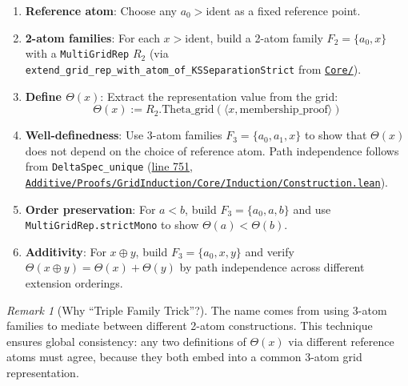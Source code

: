 \documentclass[11pt]{article}
\theoremstyle{definition}
\theoremstyle{remark}
\newtheorem{remark}[theorem]{Remark}
\begin{document}
\begin{enumerate}
\item \textbf{Reference atom}: Choose any $a_0 > \text{ident}$ as a fixed reference point.

\item \textbf{2-atom families}: For each $x > \text{ident}$, build a 2-atom family $F_2 = \{a_0, x\}$
with a \texttt{MultiGridRep} $R_2$ (via \texttt{extend\_grid\_rep\_with\_atom\_of\_KSSeparationStrict}
from \href{https://github.com/zariuq/ks-foundations-of-inference/tree/main/KnuthSkilling/Additive/Proofs/GridInduction/Core/}{\texttt{Core/}}).

\item \textbf{Define $\Theta(x)$}: Extract the representation value from the grid:
\[ \Theta(x) := R_2.\text{Theta\_grid}(\langle x, \text{membership\_proof} \rangle) \]

\item \textbf{Well-definedness}: Use 3-atom families $F_3 = \{a_0, a_1, x\}$ to show that $\Theta(x)$
does not depend on the choice of reference atom. Path independence follows from
\texttt{DeltaSpec\_unique} (\href{https://github.com/zariuq/ks-foundations-of-inference/blob/main/KnuthSkilling/Additive/Proofs/GridInduction/Core/Induction/Construction.lean\#L751}{line 751}, \href{https://github.com/zariuq/ks-foundations-of-inference/blob/main/KnuthSkilling/Additive/Proofs/GridInduction/Core/Induction/Construction.lean}{\texttt{Additive/Proofs/GridInduction/Core/Induction/Construction.lean}}).

\item \textbf{Order preservation}: For $a < b$, build $F_3 = \{a_0, a, b\}$ and use
\texttt{MultiGridRep.strictMono} to show $\Theta(a) < \Theta(b)$.

\item \textbf{Additivity}: For $x \oplus y$, build $F_3 = \{a_0, x, y\}$ and verify
$\Theta(x \oplus y) = \Theta(x) + \Theta(y)$ by path independence across different extension orderings.
\end{enumerate}

\begin{remark}[Why ``Triple Family Trick''?]
The name comes from using 3-atom families to mediate between different 2-atom constructions.
This technique ensures global consistency: any two definitions of $\Theta(x)$ via different reference atoms
must agree, because they both embed into a common 3-atom grid representation.
\end{remark}
\end{document}

